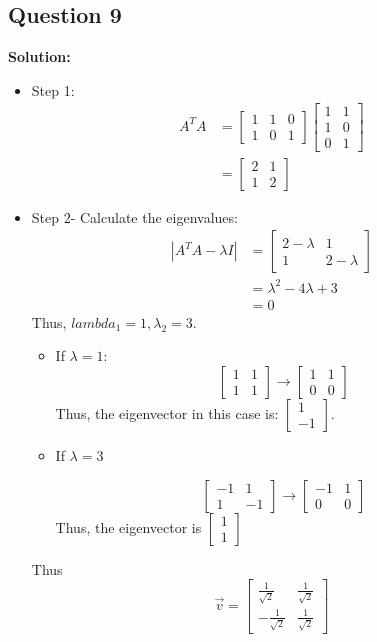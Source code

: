 \documentclass[11pt]{article} %
\begin{document}
\begin{enumerate}
\section{Question 9}
\textbf{Solution:}

\begin{itemize}
	\item  Step 1:
	\begin{align*}
		A^{T}A&=\begin{bmatrix}
			1&1&0\\1&0&1
		\end{bmatrix}\begin{bmatrix}
		1&1\\
		1&0\\
		0&1
	\end{bmatrix}\\
&=\begin{bmatrix}
	2&1\\
	1&2
\end{bmatrix}
	\end{align*}

\item Step 2- Calculate the eigenvalues:
\begin{align*}
	|A^{T}A-\lambda I|&=\begin{bmatrix}
		2-\lambda&1\\
		1&2-\lambda
	\end{bmatrix}\\
&=\lambda^2-4\lambda+3\\
&=0
\end{align*}
Thus, $lambda_1=1, \lambda_2=3$.

\begin{itemize}
	\item If $\lambda=1$:
	$$\begin{bmatrix}
		1&1\\
		1&1
	\end{bmatrix} \longrightarrow 
\begin{bmatrix}
	1&1\\
	0&0
\end{bmatrix}$$
Thus, the eigenvector in this case is: $\begin{bmatrix}
	1\\-1
\end{bmatrix}$.
\item If  $\lambda=3$

$$\begin{bmatrix}
	-1&1\\
	1&-1
\end{bmatrix}\longrightarrow \begin{bmatrix}
-1&1\\
0&0
\end{bmatrix}$$
Thus, the eigenvector is $\begin{bmatrix}
	1\\1
\end{bmatrix}$
\end{itemize}
Thus 
$$\vec{v}=\begin{bmatrix}
	\frac{1}{\sqrt{2}}&\frac{1}{\sqrt{2}}\\
	-\frac{1}{\sqrt{2}}&\frac{1}{\sqrt{2}}
\end{bmatrix}$$


\end{itemize}
\end{enumerate}
\end{document}
